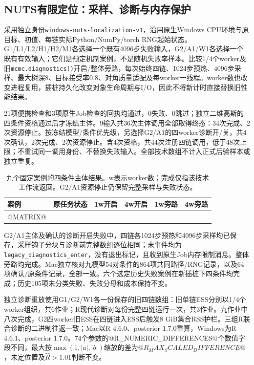 \subsection{NUTS有限定位：采样、诊断与内存保护}\label{sec:nuts-localization}
采用独立身份\texttt{windows-nuts-localization-v1}，沿用原生Windows CPU环境与原目标、初值、每链实际Python/NumPy/torch RNG起始状态。G1/L1/L2/H1/H2/M1各选择一个既有4096步失败输入，G2/A1/W1各选择一个既有有效输入；它们是预定机制案例，不是随机失败率样本。比较1/4个worker及旧\texttt{mcmc.diagnostics()}开启/整体旁路，每次始终四链、1024步预热、4096步采样、最大树深8、目标接受率0.8、对角质量适配及每worker一线程。worker数也改变进程复用，插桩持久化改变对象生命周期与I/O，因此不将新计时直接替换旧性能结果。

21项便携检查和3项原生Job检查的回执均通过，0失败、0跳过；独立二维高斯的四条件资格通过后才冻结主体。9输入共36次主体调用全部取得终态：34次完成、2次资源停止。按冻结模型/条件优先级，另选择G2/A1的四worker诊断开/关，共4次确认，2次完成、2次资源停止。含4次资格，共44次注册四链调用，低于48次上限；不重试同一调用身份、不替换失败输入。全部技术数组不计入正式后验样本或独立重复。

\begin{table}[htbp]\centering\small
\begin{tabular}{llcccc}\toprule
案例 & 原任务状态 & 1w开启 & 4w开启 & 1w旁路 & 4w旁路\\\midrule
@MATRIX@
\bottomrule\end{tabular}
\caption{九个固定案例的四条件主体结果。w表示worker数；完成仅指该技术工作流返回。G2/A1资源停止仍保留完整采样与失败状态。}
\end{table}

G2/A1主体及确认的诊断开启失败中，四链各1024步预热和4096步采样均已保存，采样钩子分块与诊断前完整数组逐位相同；末事件均为\texttt{legacy\_diagnostics\_enter}，没有退出标记，且收到原生Job内存限制消息。整体旁路均完成。Mac独立核对九模型54对条件的864项共同路径/RNG记录，以及64项确认/原条件记录，全部一致。六个选定历史失败案例在新插桩下四条件均完成；历史105项未分类失败、失败分母和成本保持不变。

独立诊断重放使用G1/G2/W1各一份保存的旧四链数组：旧单链ESS分别以1/4个worker组织，共6作业；R现代诊断对每份完整四链运行一次，共3作业。九作业中八次完成，G2四worker旧ESS在四链进入ESS后触发8 GiB集合RSS护栏。三组R联合诊断的二进制往返一致；Mac以R 4.6.0、posterior 1.7.0重算，Windows为R 4.6.1、posterior 1.7.0。74个参数的@R_NUMERIC_DIFFERENCES@个数值字段不同，最大按$\max(1,|a|,|b|)$缩放的差为$@R_MAX_SCALED_DIFFERENCE@$，未定位置及$\hat R>1.01$判断不变。

